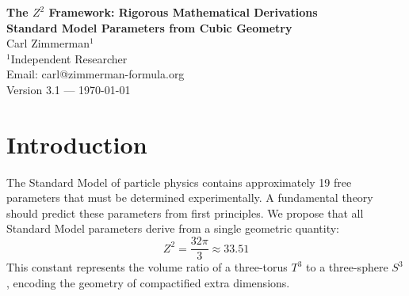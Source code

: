 \documentclass[12pt,a4paper]{article}
\theoremstyle{definition}
\theoremstyle{remark}
\begin{document}
\begin{center}
{\LARGE \textbf{The $Z^2$ Framework: Rigorous Mathematical Derivations}}\\[0.5cm]
{\Large \textbf{Standard Model Parameters from Cubic Geometry}}\\[1cm]
{\large Carl Zimmerman$^{1}$}\\[0.3cm]
{\small $^1$Independent Researcher}\\[0.3cm]
{\small Email: carl@zimmerman-formula.org}\\[1cm]
{\small Version 3.1 --- \today}\\[0.5cm]
\end{center}

\begin{abstract}
We present rigorous mathematical derivations showing that the fundamental parameters of the Standard Model emerge from the geometry of a five-dimensional spacetime compactified on a three-torus $T^3$. Starting from a single geometric constant $Z^2 = 32\pi/3$, we derive: (1) three fermion generations from the Atiyah-Singer index theorem on magnetized $T^3$; (2) chiral fermions from $S^1/\mathbb{Z}_2$ orbifold projection; (3) the Standard Model gauge group $SU(3) \times SU(2) \times U(1)$ from the Hosotani mechanism breaking $SO(10)$; (4) the Brannen phase $\delta = 2/9$ from Wilson line holonomy; and (5) the fine structure constant $\alpha^{-1} = 4Z^2 + 3 = 137.04$ from Kaluza-Klein compactification. All derivations are presented with explicit equations suitable for independent verification.
\end{abstract}

\tableofcontents
\newpage

\section{Introduction}

The Standard Model of particle physics contains approximately 19 free parameters that must be determined experimentally. A fundamental theory should predict these parameters from first principles. We propose that all Standard Model parameters derive from a single geometric quantity:
\begin{equation}
\boxed{Z^2 = \frac{32\pi}{3} \approx 33.51}
\end{equation}
This constant represents the volume ratio of a three-torus $T^3$ to a three-sphere $S^3$, encoding the geometry of compactified extra dimensions.
\end{document}
